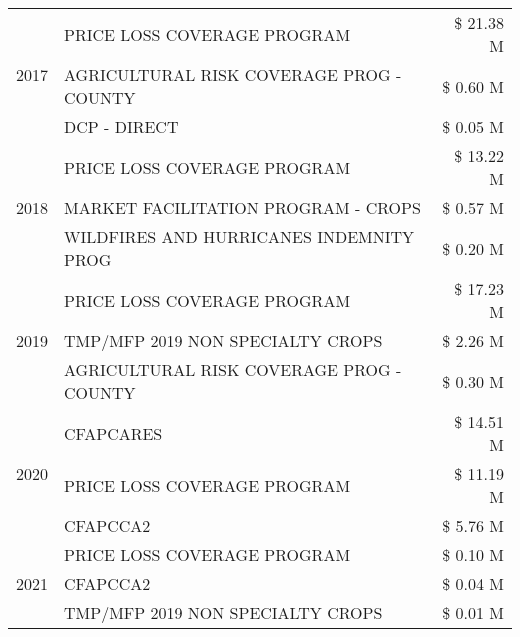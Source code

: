 \begin{tabular}{llr}
\cline{1-3}
\multirow[t]{3}{*}{2017} & PRICE LOSS COVERAGE PROGRAM & \$ 21.38 M \\
 & AGRICULTURAL RISK COVERAGE PROG - COUNTY & \$ 0.60 M \\
 & DCP - DIRECT & \$ 0.05 M \\
\cline{1-3}
\multirow[t]{3}{*}{2018} & PRICE LOSS COVERAGE PROGRAM & \$ 13.22 M \\
 & MARKET FACILITATION PROGRAM - CROPS & \$ 0.57 M \\
 & WILDFIRES AND HURRICANES INDEMNITY PROG & \$ 0.20 M \\
\cline{1-3}
\multirow[t]{3}{*}{2019} & PRICE LOSS COVERAGE PROGRAM & \$ 17.23 M \\
 & TMP/MFP 2019 NON SPECIALTY CROPS & \$ 2.26 M \\
 & AGRICULTURAL RISK COVERAGE PROG - COUNTY & \$ 0.30 M \\
\cline{1-3}
\multirow[t]{3}{*}{2020} & CFAPCARES & \$ 14.51 M \\
 & PRICE LOSS COVERAGE PROGRAM & \$ 11.19 M \\
 & CFAPCCA2 & \$ 5.76 M \\
\cline{1-3}
\multirow[t]{3}{*}{2021} & PRICE LOSS COVERAGE PROGRAM & \$ 0.10 M \\
 & CFAPCCA2 & \$ 0.04 M \\
 & TMP/MFP 2019 NON SPECIALTY CROPS & \$ 0.01 M \\
\cline{1-3}
\bottomrule
\end{tabular}
